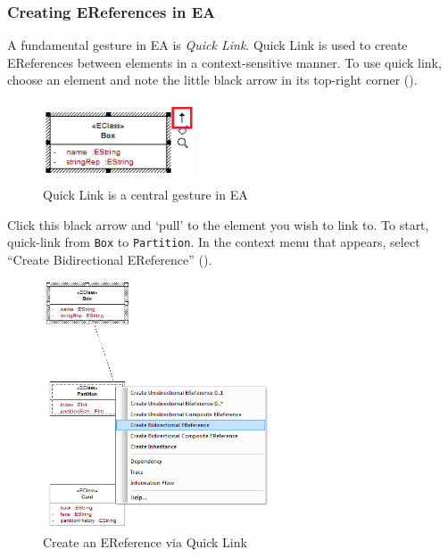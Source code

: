 \newpage
\subsubsection{Creating EReferences in EA}
\genHeader
\hypertarget{static:references vis}{}

\begin{stepbystep}

\item A fundamental gesture in EA is \emph{Quick Link}. Quick Link is used to create EReferences between elements in a context-sensitive
manner. To use quick link, choose an element and note the little black arrow in its top-right corner ().

\begin{figure}[htbp]
	\centering
  \includegraphics[width=0.4\textwidth]{../../org.moflon.doc.handbook.02_leitnersLearningBox/2_staticSemantics/3_connectingClasses/ccVisImages/ea_quickLink}
	\caption{Quick Link is a central gesture in EA}
	\label{ea:quicklink}
\end{figure}
\FloatBarrier

\item Click this black arrow and `pull' to the element you wish to link to. To start, quick-link from \texttt{Box} to \texttt{Partition}.
In the context menu that appears, select ``Create Bidirectional EReference'' ().

\begin{figure}[htbp]
	\centering
  \includegraphics[width=0.6\textwidth]{../../org.moflon.doc.handbook.02_leitnersLearningBox/2_staticSemantics/3_connectingClasses/ccVisImages/ea_eReferenceBidirectional}
	\caption{Create an EReference via Quick Link}
	\label{ea:ereference}
\end{figure}
\FloatBarrier


\end{stepbystep}
